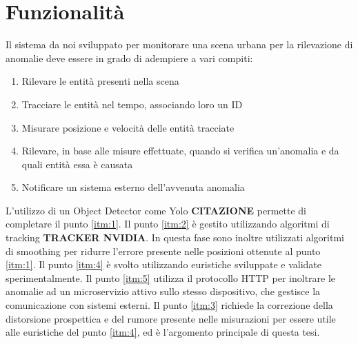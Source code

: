 \chapter{Funzionalità}
\label{sec:funzionalita}

Il sistema da noi sviluppato per monitorare una scena urbana per la rilevazione di anomalie deve essere in grado di adempiere a vari compiti:
\begin{enumerate}
    \item \label{itm:1} Rilevare le entità presenti nella scena
    \item \label{itm:2} Tracciare le entità nel tempo, associando loro un ID
    \item \label{itm:3} Misurare posizione e velocità delle entità tracciate
    \item \label{itm:4} Rilevare, in base alle misure effettuate, quando si verifica un'anomalia e da quali entità essa è causata
    \item \label{itm:5} Notificare un sistema esterno dell'avvenuta anomalia
\end{enumerate}

L'utilizzo di un Object Detector come Yolo \textbf{CITAZIONE} permette di completare il punto \ref{itm:1}.
Il punto \ref{itm:2} è gestito utilizzando algoritmi di tracking \textbf{TRACKER NVIDIA}. In questa fase sono inoltre utilizzati algoritmi di smoothing per ridurre l'errore presente nelle posizioni ottenute al punto \ref{itm:1}.
Il punto \ref{itm:4} è svolto utilizzando euristiche sviluppate e validate sperimentalmente. 
Il punto \ref{itm:5} utilizza il protocollo HTTP per inoltrare le anomalie ad un microservizio attivo sullo stesso dispositivo, che gestisce la comunicazione con sistemi esterni.
Il punto \ref{itm:3} richiede la correzione della distorsione prospettica e del rumore presente nelle misurazioni per essere utile alle euristiche del punto \ref{itm:4}, ed è l'argomento principale di questa tesi.

